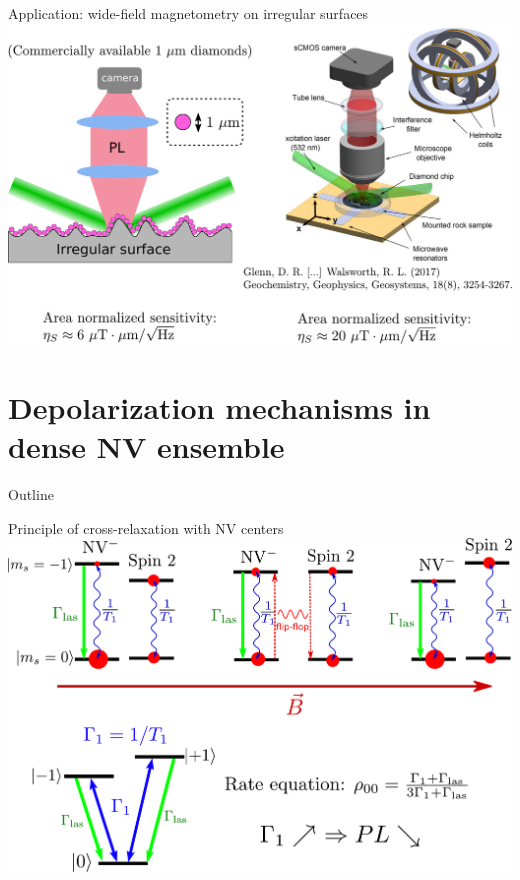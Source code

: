 \documentclass{beamer}
\begin{document}
\begin{frame}{Application: wide-field magnetometry on irregular surfaces}
\centering
\includegraphics[width=\textwidth,height=0.9\textheight,keepaspectratio]{Slide_applications_wide_field}
\end{frame}

\section{Depolarization mechanisms in dense NV ensemble}
\begin{frame}{Outline}
\tableofcontents[currentsection]
\end{frame}
\begin{frame}{Principle of cross-relaxation with NV centers}
\centering
\includegraphics[width=\textwidth,height=0.8\textheight,keepaspectratio]{Slide_CR_presentation}
\end{frame}
\end{document}
